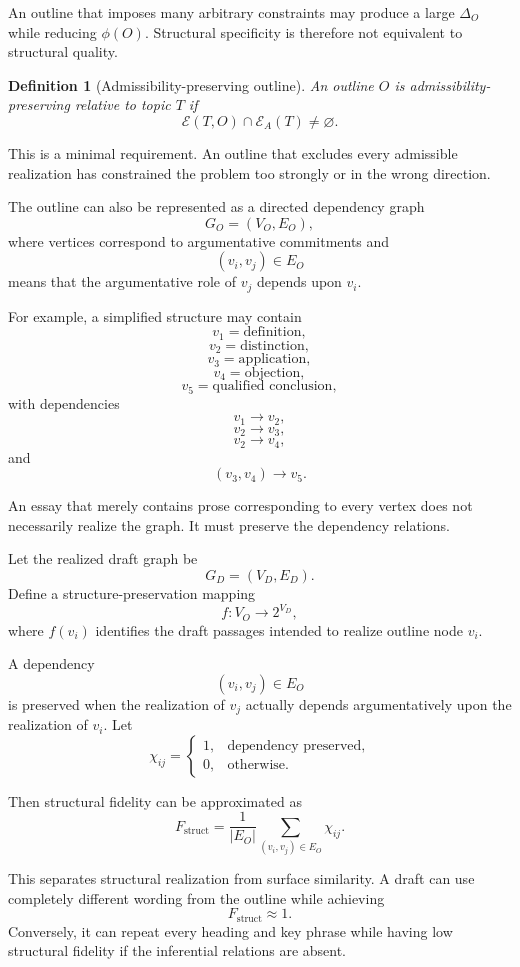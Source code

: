 \documentclass[11pt]{article}
\newtheorem{definition}{Definition}[section]
\begin{document}
An outline that imposes many arbitrary constraints may produce a large
\(\Delta_O\) while reducing \(\phi(O)\). Structural specificity is therefore not equivalent to structural quality.

\begin{definition}[Admissibility-preserving outline]
An outline \(O\) is admissibility-preserving relative to topic \(T\) if
\[
    \mathcal{E}(T,O)\cap\mathcal{E}_A(T)
    \neq\varnothing.
\]
\end{definition}

This is a minimal requirement. An outline that excludes every admissible realization has constrained the problem too strongly or in the wrong direction.

The outline can also be represented as a directed dependency graph
\[
    G_O=(V_O,E_O),
\]
where vertices correspond to argumentative commitments and
\[
    (v_i,v_j)\in E_O
\]
means that the argumentative role of \(v_j\) depends upon \(v_i\).

For example, a simplified structure may contain
\[
    v_1=\text{definition},
\]
\[
    v_2=\text{distinction},
\]
\[
    v_3=\text{application},
\]
\[
    v_4=\text{objection},
\]
\[
    v_5=\text{qualified conclusion},
\]
with dependencies
\[
    v_1\rightarrow v_2,
\]
\[
    v_2\rightarrow v_3,
\]
\[
    v_2\rightarrow v_4,
\]
and
\[
    (v_3,v_4)\rightarrow v_5.
\]

An essay that merely contains prose corresponding to every vertex does not necessarily realize the graph. It must preserve the dependency relations.

Let the realized draft graph be
\[
    G_D=(V_D,E_D).
\]
Define a structure-preservation mapping
\[
    f:V_O\rightarrow 2^{V_D},
\]
where \(f(v_i)\) identifies the draft passages intended to realize outline node \(v_i\).

A dependency
\[
    (v_i,v_j)\in E_O
\]
is preserved when the realization of \(v_j\) actually depends argumentatively upon the realization of \(v_i\). Let
\[
    \chi_{ij}
    =
    \begin{cases}
    1, & \text{dependency preserved},\\
    0, & \text{otherwise}.
    \end{cases}
\]

Then structural fidelity can be approximated as
\[
    F_{\mathrm{struct}}
    =
    \frac{1}{|E_O|}
    \sum_{(v_i,v_j)\in E_O}
    \chi_{ij}.
\]

This separates structural realization from surface similarity. A draft can use completely different wording from the outline while achieving
\[
    F_{\mathrm{struct}}\approx1.
\]
Conversely, it can repeat every heading and key phrase while having low structural fidelity if the inferential relations are absent.
\end{document}
